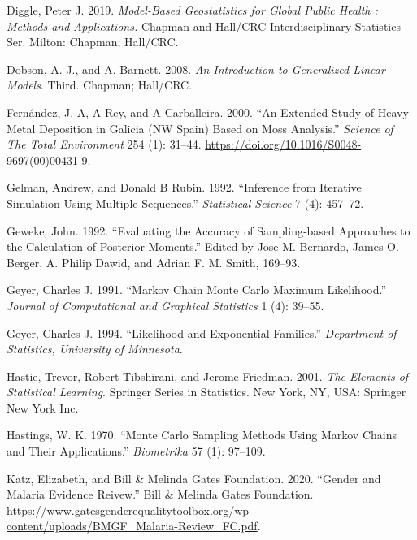 \documentclass[
  letterpaper,
]{krantz}
\newlength{\cslhangindent}
\newlength{\cslentryspacingunit} %
\newenvironment{CSLReferences}[2] %
 {%
  \setlength{\parindent}{0pt}
  \ifodd #1
  \let\oldpar\par
  \def\par{\hangindent=\cslhangindent\oldpar}
  \fi
  \setlength{\parskip}{#2\cslentryspacingunit}
 }%
 {}
\begin{document}
\begin{CSLReferences}{1}{0}
\leavevmode{}%
Diggle, Peter J. 2019. \emph{Model-Based Geostatistics for Global Public
Health : Methods and Applications.} Chapman and Hall/CRC
Interdisciplinary Statistics Ser. Milton: Chapman; Hall/CRC.

\leavevmode{}%
Dobson, A. J., and A. Barnett. 2008. \emph{An Introduction to
Generalized Linear Models}. Third. Chapman; Hall/CRC.

\leavevmode{}%
Fernández, J. A, A Rey, and A Carballeira. 2000. {``An Extended Study of
Heavy Metal Deposition in Galicia (NW Spain) Based on Moss Analysis.''}
\emph{Science of The Total Environment} 254 (1): 31--44.
\url{https://doi.org/10.1016/S0048-9697(00)00431-9}.

\leavevmode{}%
Gelman, Andrew, and Donald B Rubin. 1992. {``Inference from Iterative
Simulation Using Multiple Sequences.''} \emph{Statistical Science} 7
(4): 457--72.

\leavevmode{}%
Geweke, John. 1992. {``Evaluating the Accuracy of Sampling‐based
Approaches to the Calculation of Posterior Moments.''} Edited by Jose M.
Bernardo, James O. Berger, A. Philip Dawid, and Adrian F. M. Smith,
169--93.

\leavevmode{}%
Geyer, Charles J. 1991. {``Markov Chain Monte Carlo Maximum
Likelihood.''} \emph{Journal of Computational and Graphical Statistics}
1 (4): 39--55.

\leavevmode{}%
Geyer, Charles J. 1994. {``Likelihood and Exponential Families.''}
\emph{Department of Statistics, University of Minnesota}.

\leavevmode{}%
Hastie, Trevor, Robert Tibshirani, and Jerome Friedman. 2001. \emph{The
Elements of Statistical Learning}. Springer Series in Statistics. New
York, NY, USA: Springer New York Inc.

\leavevmode{}%
Hastings, W. K. 1970. {``Monte Carlo Sampling Methods Using Markov
Chains and Their Applications.''} \emph{Biometrika} 57 (1): 97--109.

\leavevmode{}%
Katz, Elizabeth, and Bill \& Melinda Gates Foundation. 2020. {``Gender
and Malaria Evidence Reivew.''} Bill \& Melinda Gates Foundation.
\url{https://www.gatesgenderequalitytoolbox.org/wp-content/uploads/BMGF_Malaria-Review_FC.pdf}.


\end{CSLReferences}
\end{document}

